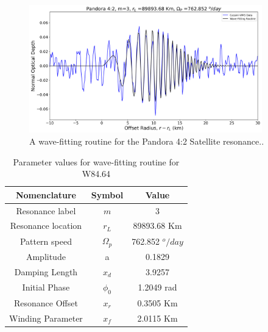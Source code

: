 \documentclass{article}
\begin{document}
\begin{figure}[h]
\centering 
\includegraphics[width=0.9\textwidth]{pandora_42_wavefit.png} 
\caption{A wave-fitting routine for the Pandora 4:2 Satellite resonance..} \label{fig:my_label}
\end{figure}

\begin{table}
\centering
\begin{tabular}{|c|c|c|}
\hline
\textbf{Nomenclature} & \textbf{Symbol} & \textbf{Value} \\
\hline
Resonance label & $m$ & 3 \\
\hline
Resonance location & $r_{L}$ & 89893.68 Km \\
\hline
Pattern speed & $\Omega_{p}$ & 762.852 $^{o}/day$ \\
\hline
Amplitude & a & 0.1829 \\
\hline
Damping Length & $x_{d}$ & 3.9257 \\
\hline
Initial Phase & $\phi_{0}$ & 1.2049 rad \\
\hline
Resonance Offset & $x_{r}$ & 0.3505 Km \\
\hline
Winding Parameter & $x_{f}$ & 2.0115 Km \\
\hline
\end{tabular}
\caption{Parameter values for wave-fitting routine for W84.64}
\end{table}







\end{document}
